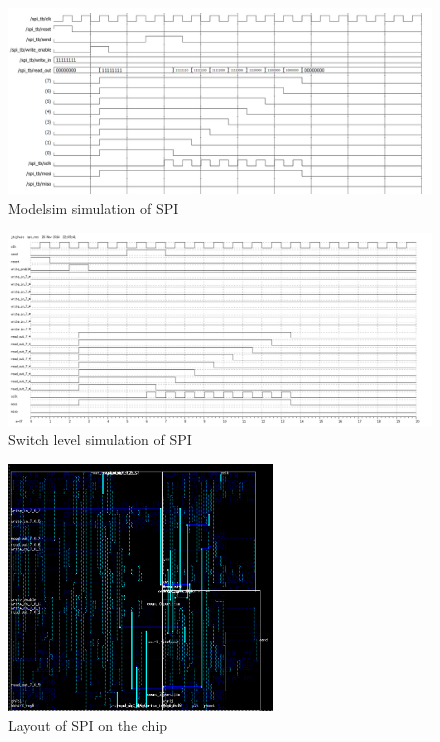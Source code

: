 \documentclass[11pt,twoside,a4paper]{article}
\begin{document}
\begin{figure}[htp!]
\center
\includegraphics[width=16cm]{./modelsim_sim}
\caption{Modelsim simulation of SPI}
\label{spi-modelsim}
\end{figure}

\begin{figure}[htp!]
\center
\includegraphics[width=16cm]{./switch_level}
\caption{Switch level simulation of SPI}
\label{switch-level}
\end{figure}

\begin{figure}[htp!]
\center
\includegraphics[width=7cm]{./spi_layout}
\caption{Layout of SPI on the chip}
\label{spi-layout}
\end{figure}
\end{document}
